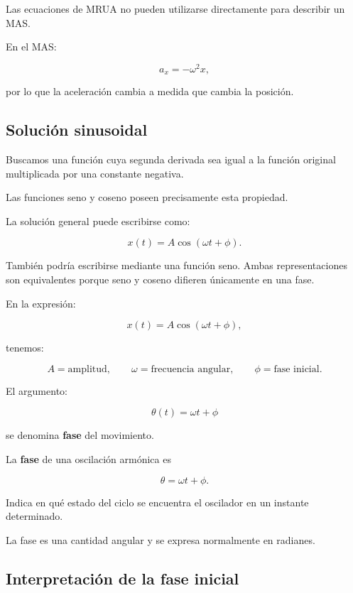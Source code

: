 \begin{advertencia}
Las ecuaciones de MRUA no pueden utilizarse directamente para describir un MAS.

En el MAS:

\[ a_x=-\omega^2x, \]

por lo que la aceleración cambia a medida que cambia la posición.
\end{advertencia}

\subsection{Solución sinusoidal}

Buscamos una función cuya segunda derivada sea igual a la función original multiplicada por una constante negativa.

Las funciones seno y coseno poseen precisamente esta propiedad.

La solución general puede escribirse como:

\[ \boxed{x(t)=A\cos(\omega t+\phi)}. \]

También podría escribirse mediante una función seno. Ambas representaciones son equivalentes porque seno y coseno difieren únicamente en una fase.

En la expresión:

\[ x(t)=A\cos(\omega t+\phi), \]

tenemos:

\[
A=\text{amplitud},
\qquad
\omega=\text{frecuencia angular},
\qquad
\phi=\text{fase inicial}.
\]

El argumento:

\[ \theta(t)=\omega t+\phi \]

se denomina \textbf{fase} del movimiento.

\begin{definicion}[Fase]
La \textbf{fase} de una oscilación armónica es

\[ \boxed{\theta=\omega t+\phi}. \]

Indica en qué estado del ciclo se encuentra el oscilador en un instante determinado.
\end{definicion}

La fase es una cantidad angular y se expresa normalmente en radianes.

\subsection{Interpretación de la fase inicial}

